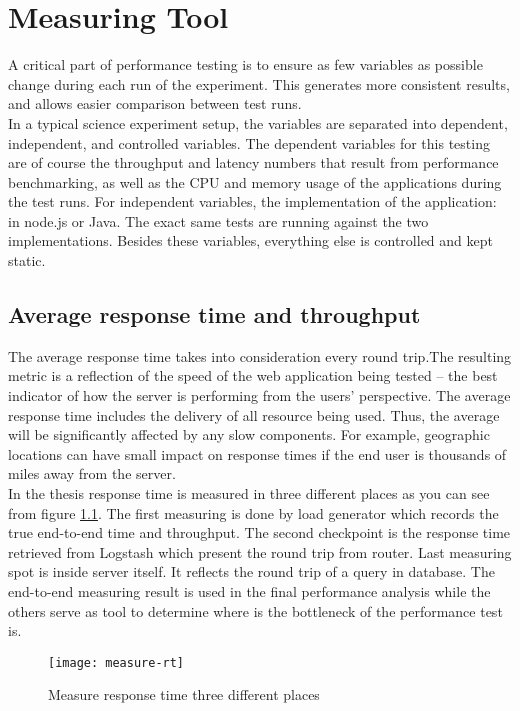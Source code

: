 \chapter{Measuring Tool}
A critical part of performance testing is to ensure as few variables as possible change during each run of the experiment. This generates more consistent results, and allows easier comparison between test runs.\\
In a typical science experiment setup, the variables are separated into dependent, independent, and controlled variables. The dependent variables for this testing are of course the throughput and latency numbers that result from performance benchmarking, as well as the CPU and memory usage of the applications during the test runs. For independent variables, the implementation of the application: in node.js or Java. The exact same tests are running against the two implementations. Besides these variables, everything else is controlled and kept static.\\


\section{Average response time and throughput}
The average response time takes into consideration every round trip.The resulting metric is a reflection of the speed of the web application being tested – the best indicator of how the server is performing from the users’ perspective. The average response time includes the delivery of all resource being used. Thus, the average will be significantly affected by any slow components. For example,  geographic locations can have small impact on response times if the end user is thousands of miles away from the server.\\
In the thesis response time is measured in three different places as you can see from figure \ref{measure-rt}. The first measuring is done by load generator which records the true end-to-end time and throughput. The second checkpoint is the response time retrieved from Logstash which present the round trip from router. Last measuring spot is inside server itself. It reflects the round trip of a query in database. The end-to-end measuring result is used in the final performance analysis while the others serve as tool to determine where is the bottleneck of the performance test is. \\

\begin{figure}[h]
	\centering
	\texttt{[image: measure-rt]}
	\caption{Measure response time three different places}
	\label{measure-rt}
\end{figure}

